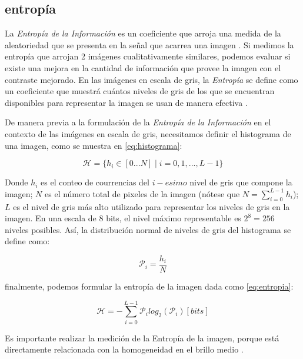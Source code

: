 \documentclass[spanish]{article}
\begin{document}
\subsection{entropía}
\label{ssec:entropia}

La {\it Entropía de la Información} es un coeficiente que arroja una medida de la aleatoriedad que se presenta en la señal que acarrea una imagen \cite{tsai2008information}. Si medimos la entropía que arrojan 2 imágenes cualitativamente similares, podemos evaluar si existe una mejora en la cantidad de información que provee la imagen con el contraste mejorado. En las imágenes en escala de gris, la {\it Entropía} se define como un coeficiente que muestrá cuántos niveles de gris de los que se encuentran disponibles para representar la imagen se usan de manera efectiva \cite{kwok2006intensity}.

De manera previa a la formulación de la {\it Entropía de la Información} en el contexto de las imágenes en escala de gris, necesitamos definir el histograma de una imagen, como se muestra en \eqref{eq:histograma}:

\begin{equation}\label{eq:histograma}
    \mathcal{H}=\{h_i \in [0...N]\mid i=0,1,...,L-1\}
\end{equation}

Donde $h_i$ es el conteo de courrencias del $i-esimo$ nivel de gris que compone la imagen; $N$ es el número total de pixeles de la imagen (nótese que $N=\sum_{i=0}^{L-1}h_i$); $L$ es el nivel de gris más alto utilizado para representar los niveles de gris en la imagen. En una escala de 8 bits, el nivel máximo representable es $2^8=256$ niveles posibles. Así, la distribución normal de niveles de gris del histograma se define como: 

\begin{equation}\label{eq:distribucionormal}
\mathcal{P}_i=\frac{h_i}{N}
\end{equation}

finalmente, podemos formular la entropía de la imagen dada como \eqref{eq:entropia}:

\begin{equation}\label{eq:entropia}
\mathscr{H}=-\sum_{i=0}^{L-1}\mathcal{P}_i log_2(\mathcal{P}_i) [bits]
\end{equation}

Es importante realizar la medición de la Entropía de la imagen, porque está directamente relacionada con la homogeneidad en el brillo medio \cite{108593}. 
\end{document}
